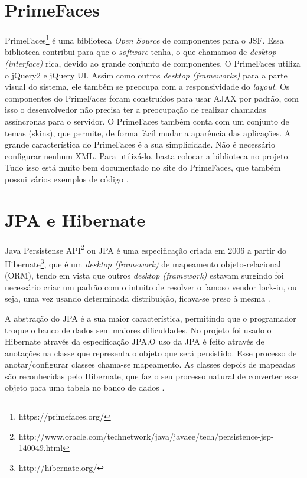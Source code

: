 \section{PrimeFaces}
\label{sec:embasamentoTeoricoPrimeFaces}

PrimeFaces\footnote{https://primefaces.org/} é uma biblioteca \textit{Open Source} de componentes para o JSF. Essa biblioteca contribui para que o \textit{software} tenha, o que chamamos de \textit{desktop (interface)} rica, devido ao grande conjunto de componentes. O PrimeFaces utiliza o jQuery2 e jQuery UI. Assim como outros \textit{desktop (frameworks)} para a parte visual do sistema, ele também se preocupa com a responsividade do \textit{layout}.
Os componentes do PrimeFaces foram construídos para usar AJAX por padrão, com isso o desenvolvedor não precisa ter a preocupação de realizar chamadas assíncronas para o servidor. O PrimeFaces também conta com um conjunto de temas (skins), que permite, de forma fácil mudar a aparência das aplicações.
A grande característica do PrimeFaces é a sua simplicidade. Não é necessário configurar nenhum XML. Para utilizá-lo, basta colocar a biblioteca no projeto. Tudo isso está muito bem documentado no site do PrimeFaces, que também possui vários exemplos de código \cite{Civici2015}.

\section{JPA e Hibernate}
\label{sec:embasamentoTeoricoJPA}

Java Persistense API\footnote{ http://www.oracle.com/technetwork/java/javaee/tech/persistence-jsp-140049.html} ou JPA é uma especificação criada em 2006 a partir do Hibernate\footnote{http://hibernate.org/}, que é um \textit{desktop (framework)} de mapeamento objeto-relacional (ORM), tendo em vista que outros \textit{desktop (framework)} estavam surgindo foi necessário criar um padrão com o intuito de resolver o famoso vendor lock-in, ou seja, uma vez usando determinada distribuição, ficava-se preso à mesma \cite[p.~12]{Cordeiro2014}.

A abstração do JPA é a sua maior característica, permitindo que o programador troque o banco de dados sem maiores dificuldades. No projeto \imprimirtitulo \space foi usado o Hibernate através da especificação JPA.O uso da JPA é feito através de anotações na classe que representa o objeto que será persistido. Esse processo de anotar/configurar classes chama-se mapeamento. As classes depois de mapeadas são reconhecidas pelo Hibernate, que faz o seu processo natural de converter esse objeto para uma tabela no banco de dados \cite{Cordeiro2014}.


